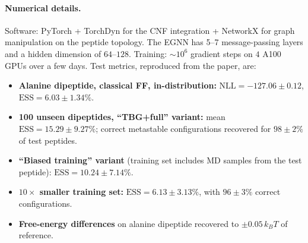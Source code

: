 \documentclass[11pt,letterpaper]{article}
\newcommand{\ESS}{\mathrm{ESS}}
\theoremstyle{plain}
\begin{document}
\paragraph{Numerical details.} Software: PyTorch + TorchDyn for the CNF
integration + NetworkX for graph manipulation on the peptide topology. The
EGNN has 5--7 message-passing layers and a hidden dimension of $64$--$128$.
Training: $\sim 10^6$ gradient steps on $4$ A100 GPUs over a few days. Test
metrics, reproduced from the paper, are:
\begin{itemize}\setlength{\itemsep}{1pt}
  \item \textbf{Alanine dipeptide, classical FF, in-distribution:}
    $\mathrm{NLL} = -127.06\pm 0.12$, $\ESS = 6.03\pm 1.34\%$.
  \item \textbf{100 unseen dipeptides, ``TBG+full'' variant:} mean
    $\ESS = 15.29\pm 9.27\%$; correct metastable configurations recovered
    for $98\pm 2\%$ of test peptides.
  \item \textbf{``Biased training'' variant} (training set includes MD
    samples from the test peptide): $\ESS = 10.24\pm 7.14\%$.
  \item \textbf{$10\times$ smaller training set:} $\ESS = 6.13\pm 3.13\%$,
    with $96\pm 3\%$ correct configurations.
  \item \textbf{Free-energy differences} on alanine dipeptide recovered to
    $\pm 0.05\,k_BT$ of reference.
\end{itemize}
\end{document}
